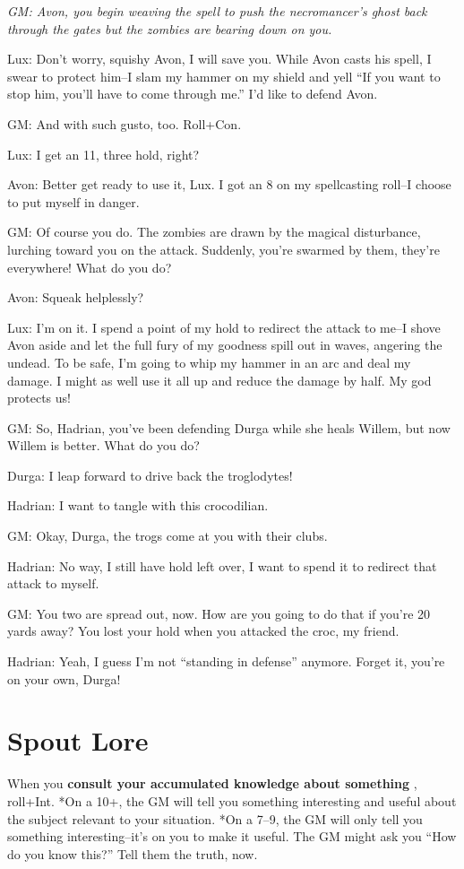 {\itshape
GM: Avon, you begin weaving the spell to push the necromancer's ghost back through the gates but the zombies are bearing down on you.

Lux: Don't worry, squishy Avon, I will save you. While Avon casts his spell, I swear to protect him--I slam my hammer on my shield and yell ``If you want to stop him, you'll have to come through me.'' I'd like to defend Avon.

GM: And with such gusto, too. Roll+Con.

Lux: I get an 11, three hold, right?

Avon: Better get ready to use it, Lux. I got an 8 on my spellcasting roll--I choose to put myself in danger.

GM: Of course you do. The zombies are drawn by the magical disturbance, lurching toward you on the attack. Suddenly, you're swarmed by them, they're everywhere! What do you do?

Avon: Squeak helplessly?

Lux: I'm on it. I spend a point of my hold to redirect the attack to me--I shove Avon aside and let the full fury of my goodness spill out in waves, angering the undead. To be safe, I'm going to whip my hammer in an arc and deal my damage. I might as well use it all up and reduce the damage by half. My god protects us!

GM: So, Hadrian, you've been defending Durga while she heals Willem, but now Willem is better. What do you do?

Durga: I leap forward to drive back the troglodytes!

Hadrian: I want to tangle with this crocodilian.

GM: Okay, Durga, the trogs come at you with their clubs.

Hadrian: No way, I still have hold left over, I want to spend it to redirect that attack to myself.

GM: You two are spread out, now. How are you going to do that if you're 20 yards away? You lost your hold when you attacked the croc, my friend.

Hadrian: Yeah, I guess I'm not ``standing in defense'' anymore. Forget it, you're on your own, Durga!
}
\section*{Spout Lore}
\HRule
When you \textbf{consult your accumulated knowledge about something}
, roll+Int. *On a 10+, the GM will tell you something interesting and useful about the subject relevant to your situation. *On a 7--9, the GM will only tell you something interesting--it's on you to make it useful. The GM might ask you ``How do you know this?'' Tell them the truth, now.
\HRule

